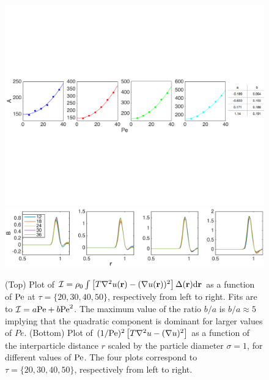 \documentclass[pre, superscriptaddress, twocolumn,pre]{revtex4-1}
\newcommand{\dd}{\text{d}}
\begin{document}
\begin{figure}
	\centering
	\includegraphics[width=\linewidth]{integral_A2.pdf}
	\includegraphics[width=1.0\linewidth]{del_u_sq-del_sq_u_overPesq.eps}
	\caption{\label{fig:kirk}
		(Top) Plot of ${\cal I} = \rho_0 \int \left[ T\nabla^2 u({\bf r}) - (\nabla u({\bf r}))^2\right] \Delta({\bf r}) \dd{\bf r}$ as a function of $\rm Pe$ at $\tau=\{20,30,40,50\}$, respectively from left to right. Fits are to ${\cal I} = a {\rm Pe} + b {\rm Pe}^2$. The maximum value of the ratio $b/a$ is $b/a \approx 5$ implying that the quadratic component is dominant for larger values of $Pe$. 
		(Bottom) Plot of $(1/{\rm Pe})^2 \left[T \nabla^2 u - (\nabla u)^2\right]$ as a function of the interparticle distance $r$ scaled by the particle diameter $\sigma=1$, for different values of ${\rm Pe}$. The four plots correspond to $\tau =\{20,30,40,50\}$, respectively from left to right.
	}
\end{figure}


\end{document}

